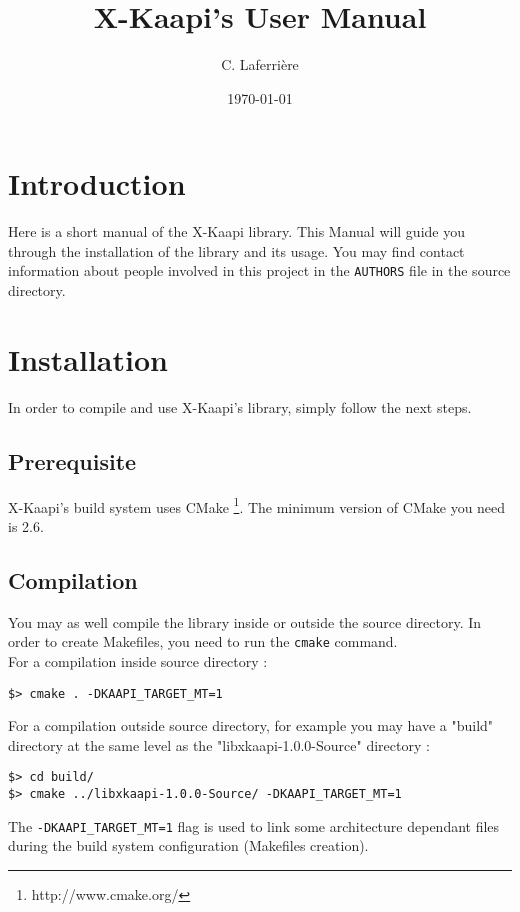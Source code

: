 \documentclass{article}
\newcommand{\kaapi}{\textsc{X}-Kaapi\xspace}
\begin{document}
\title{X-Kaapi's User Manual}
\author{C. Laferrière}
\date{\today}
\maketitle
\newpage
\tableofcontents
\newpage
\section{Introduction}


Here is a short manual of the \kaapi library. This Manual will guide you through the installation of the library and its usage.
You may find contact information about people involved in this project in the \verb+AUTHORS+ file in the source directory.

\section{Installation}

In order to compile and use \kaapi's library, simply follow the next steps.

\subsection{Prerequisite}

\kaapi 's build system uses CMake \footnote{http://www.cmake.org/}. The minimum version of CMake you need is 2.6.

\subsection{Compilation}

You may as well compile the library inside or outside the source directory. In order to create Makefiles, you need to run the \verb+cmake+ command.
\\

For a compilation inside source directory :
\begin{verbatim}
$> cmake . -DKAAPI_TARGET_MT=1
\end{verbatim}


For a compilation outside source directory, for example you may have a "build" directory at the same level as the "libxkaapi-1.0.0-Source" directory :
\begin{verbatim}
$> cd build/
$> cmake ../libxkaapi-1.0.0-Source/ -DKAAPI_TARGET_MT=1
\end{verbatim}

The \verb+-DKAAPI_TARGET_MT=1+ flag is used to link some architecture dependant files during the build system configuration (Makefiles creation).
\end{document}

